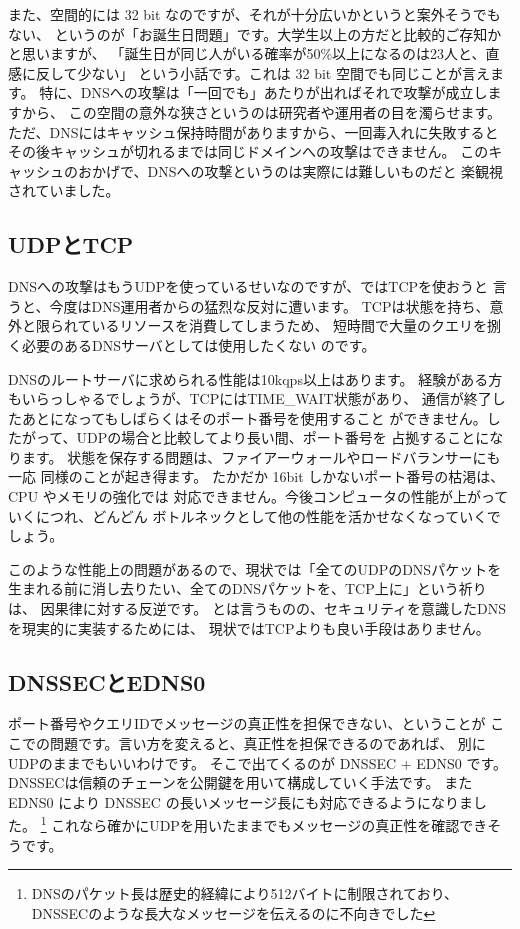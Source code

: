 また、空間的には 32 bit なのですが、それが十分広いかというと案外そうでもない、
というのが「お誕生日問題」です。大学生以上の方だと比較的ご存知かと思いますが、
「誕生日が同じ人がいる確率が50\%以上になるのは23人と、直感に反して少ない」
という小話です。これは 32 bit 空間でも同じことが言えます。
特に、DNSへの攻撃は「一回でも」あたりが出ればそれで攻撃が成立しますから、
この空間の意外な狭さというのは研究者や運用者の目を濁らせます。
ただ、DNSにはキャッシュ保持時間がありますから、一回毒入れに失敗すると
その後キャッシュが切れるまでは同じドメインへの攻撃はできません。
このキャッシュのおかげで、DNSへの攻撃というのは実際には難しいものだと
楽観視されていました。

\subsection{UDPとTCP}
DNSへの攻撃はもうUDPを使っているせいなのですが、ではTCPを使おうと
言うと、今度はDNS運用者からの猛烈な反対に遭います。
TCPは状態を持ち、意外と限られているリソースを消費してしまうため、
短時間で大量のクエリを捌く必要のあるDNSサーバとしては使用したくない
のです。

DNSのルートサーバに求められる性能は10kqps以上はあります。
経験がある方もいらっしゃるでしょうが、TCPにはTIME\_WAIT状態があり、
通信が終了したあとになってもしばらくはそのポート番号を使用すること
ができません。したがって、UDPの場合と比較してより長い間、ポート番号を
占拠することになります。
状態を保存する問題は、ファイアーウォールやロードバランサーにも一応
同様のことが起き得ます。
たかだか 16bit しかないポート番号の枯渇は、CPU やメモリの強化では
対応できません。今後コンピュータの性能が上がっていくにつれ、どんどん
ボトルネックとして他の性能を活かせなくなっていくでしょう。

このような性能上の問題があるので、現状では「全てのUDPのDNSパケットを
生まれる前に消し去りたい、全てのDNSパケットを、TCP上に」という祈りは、
因果律に対する反逆です。
とは言うものの、セキュリティを意識したDNSを現実的に実装するためには、
現状ではTCPよりも良い手段はありません。

\subsection{DNSSECとEDNS0}
ポート番号やクエリIDでメッセージの真正性を担保できない、ということが
ここでの問題です。言い方を変えると、真正性を担保できるのであれば、
別にUDPのままでもいいわけです。
そこで出てくるのが DNSSEC + EDNS0 です。
DNSSECは信頼のチェーンを公開鍵を用いて構成していく手法です。
また EDNS0 により DNSSEC の長いメッセージ長にも対応できるようになりました。
\footnote{DNSのパケット長は歴史的経緯により512バイトに制限されており、
DNSSECのような長大なメッセージを伝えるのに不向きでした}
これなら確かにUDPを用いたままでもメッセージの真正性を確認できそうです。

